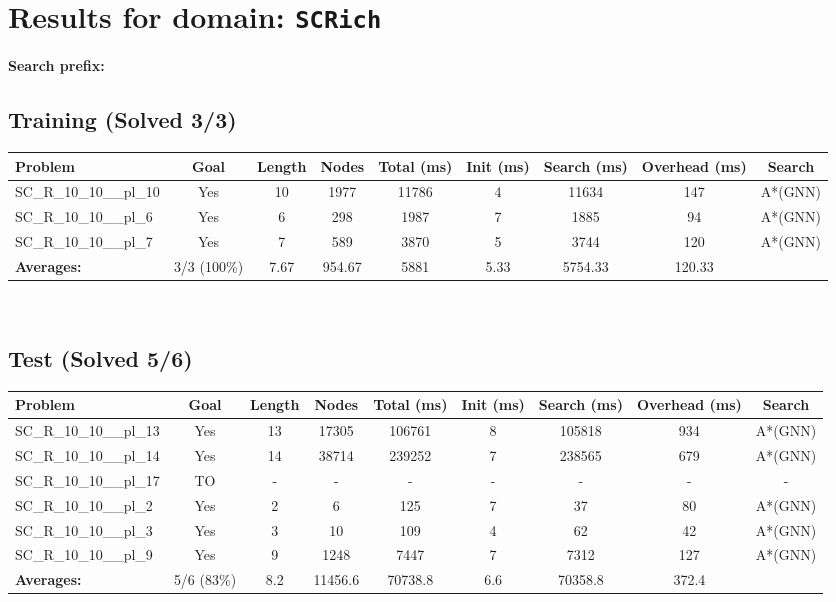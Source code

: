 \documentclass{article}
\begin{document}
\section*{Results for domain: \texttt{SCRich}}
\textbf{Search prefix:} 
\\[0.5cm]
\subsection*{Training (Solved 3/3)}
\begin{tabular}{lcccccccc}
\toprule
Problem & Goal & Length & Nodes & Total (ms) & Init (ms) & Search (ms) & Overhead (ms) & Search \\
\midrule
SC\_R\_10\_10\_\_pl\_10 & Yes & 10 & 1977 & 11786 & 4 & 11634 & 147 & A*(GNN) \\
SC\_R\_10\_10\_\_pl\_6 & Yes & 6 & 298 & 1987 & 7 & 1885 & 94 & A*(GNN) \\
SC\_R\_10\_10\_\_pl\_7 & Yes & 7 & 589 & 3870 & 5 & 3744 & 120 & A*(GNN) \\
\textbf{Averages:} & 3/3 (100\%) & 7.67 & 954.67 & 5881 & 5.33 & 5754.33 & 120.33 & \\
\bottomrule
\end{tabular}
\\[0.7cm]
\subsection*{Test (Solved 5/6)}
\begin{tabular}{lcccccccc}
\toprule
Problem & Goal & Length & Nodes & Total (ms) & Init (ms) & Search (ms) & Overhead (ms) & Search \\
\midrule
SC\_R\_10\_10\_\_pl\_13 & Yes & 13 & 17305 & 106761 & 8 & 105818 & 934 & A*(GNN) \\
SC\_R\_10\_10\_\_pl\_14 & Yes & 14 & 38714 & 239252 & 7 & 238565 & 679 & A*(GNN) \\
SC\_R\_10\_10\_\_pl\_17 & TO & - & - & - & - & - & - & - \\
SC\_R\_10\_10\_\_pl\_2 & Yes & 2 & 6 & 125 & 7 & 37 & 80 & A*(GNN) \\
SC\_R\_10\_10\_\_pl\_3 & Yes & 3 & 10 & 109 & 4 & 62 & 42 & A*(GNN) \\
SC\_R\_10\_10\_\_pl\_9 & Yes & 9 & 1248 & 7447 & 7 & 7312 & 127 & A*(GNN) \\
\textbf{Averages:} & 5/6 (83\%) & 8.2 & 11456.6 & 70738.8 & 6.6 & 70358.8 & 372.4 & \\
\bottomrule
\end{tabular}
\\[0.7cm]
\end{document}
